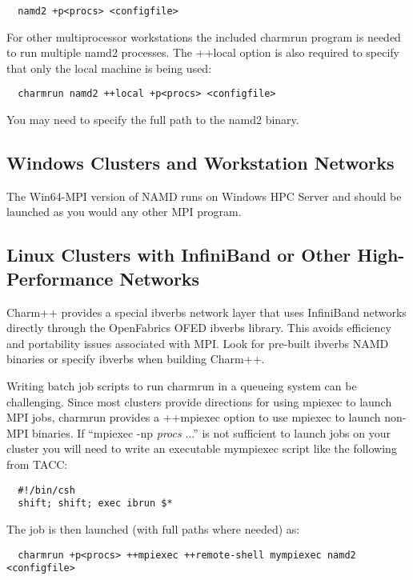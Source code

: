 \begin{verbatim}
  namd2 +p<procs> <configfile>
\end{verbatim}

For other multiprocessor workstations the included charmrun program is
needed to run multiple namd2 processes.  The ++local option is also
required to specify that only the local machine is being used:

\begin{verbatim}
  charmrun namd2 ++local +p<procs> <configfile>
\end{verbatim}

You may need to specify the full path to the namd2 binary.

\subsection{Windows Clusters and Workstation Networks}

The Win64-MPI version of NAMD runs on Windows HPC Server and should be
launched as you would any other MPI program.

\subsection{Linux Clusters with InfiniBand or Other High-Performance Networks}

Charm++ provides a special ibverbs network layer that uses InfiniBand
networks directly through the OpenFabrics OFED ibverbs library.  This
avoids efficiency and portability issues associated with MPI.  Look for
pre-built ibverbs NAMD binaries or specify ibverbs when building Charm++.

Writing batch job scripts to run charmrun in a queueing system can be
challenging.  Since most clusters provide directions for using mpiexec
to launch MPI jobs, charmrun provides a ++mpiexec option to use mpiexec
to launch non-MPI binaries.  If ``mpiexec -np {\em procs} ...'' is not
sufficient to launch jobs on your cluster you will need to write an
executable mympiexec script like the following from TACC:

\begin{verbatim}
  #!/bin/csh
  shift; shift; exec ibrun $*
\end{verbatim}

The job is then launched (with full paths where needed) as:

\begin{verbatim}
  charmrun +p<procs> ++mpiexec ++remote-shell mympiexec namd2 <configfile>
\end{verbatim}

